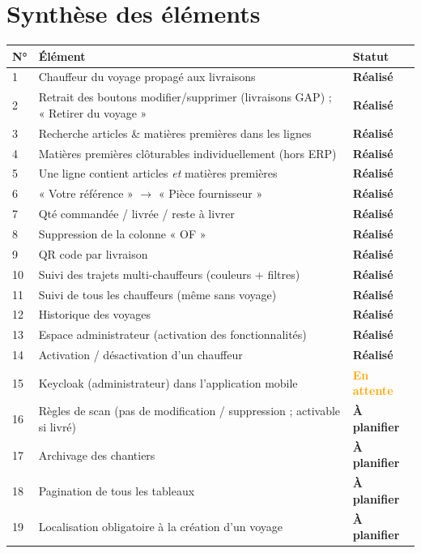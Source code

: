 \documentclass[11pt,a4paper]{article}
\newcommand{\fait}{\textcolor{vert}{\textbf{Réalisé}}}
\newcommand{\encours}{\textcolor{orange}{\textbf{En attente}}}
\newcommand{\aplanifier}{\textcolor{gris}{\textbf{À planifier}}}
\begin{document}
\section{Synthèse des éléments}
\renewcommand{\arraystretch}{1.25}
\begin{longtable}{@{}p{0.6cm} p{11.4cm} p{3.0cm}@{}}
  \toprule
  \textbf{N°} & \textbf{Élément} & \textbf{Statut} \\
  \midrule
  \endhead
  1  & Chauffeur du voyage propagé aux livraisons & \fait \\
  2  & Retrait des boutons modifier/supprimer (livraisons GAP) ; « Retirer du voyage » & \fait \\
  3  & Recherche articles \& matières premières dans les lignes & \fait \\
  4  & Matières premières clôturables individuellement (hors ERP) & \fait \\
  5  & Une ligne contient articles \emph{et} matières premières & \fait \\
  6  & « Votre référence » $\rightarrow$ « Pièce fournisseur » & \fait \\
  7  & Qté commandée / livrée / reste à livrer & \fait \\
  8  & Suppression de la colonne « OF » & \fait \\
  9  & QR code par livraison & \fait \\
  10 & Suivi des trajets multi-chauffeurs (couleurs + filtres) & \fait \\
  11 & Suivi de tous les chauffeurs (même sans voyage) & \fait \\
  12 & Historique des voyages & \fait \\
  13 & Espace administrateur (activation des fonctionnalités) & \fait \\
  14 & Activation / désactivation d'un chauffeur & \fait \\
  15 & Keycloak (administrateur) dans l'application mobile & \encours \\
  16 & Règles de scan (pas de modification / suppression ; activable si livré) & \aplanifier \\
  17 & Archivage des chantiers & \aplanifier \\
  18 & Pagination de tous les tableaux & \aplanifier \\
  19 & Localisation obligatoire à la création d'un voyage & \aplanifier \\
  \bottomrule
\end{longtable}
\end{document}
